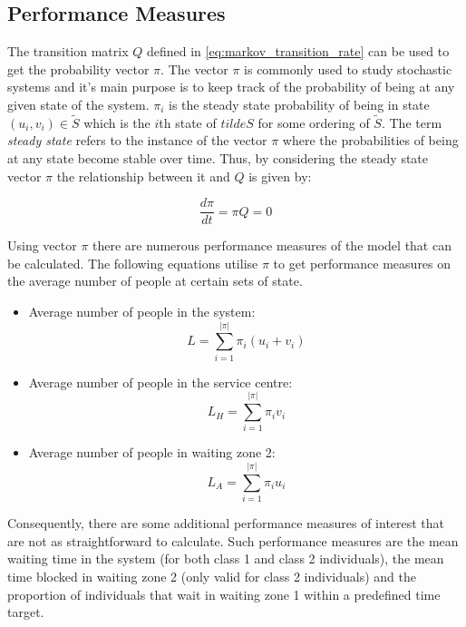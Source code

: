 \subsection{Performance Measures}


The transition matrix \( Q \) defined in \ref{eq:markov_transition_rate} can be 
used to get the probability vector \( \pi \).
The vector \( \pi \) is commonly used to study stochastic systems and it's main
purpose is to keep track of the probability of being at any given state of 
the system. \(\pi_i\) is the steady state probability of being in state \((u_i, v_i)\in\tilde S\) which is the \(i\)th state of \(tilde S\) for some ordering of \(\tilde S\).
The term \textit{steady state} refers to the instance of the vector \( \pi \) 
where the probabilities of being at any state become stable over time. 
Thus, by considering the steady state vector \( \pi \) the relationship between 
it and \( Q \) is given by:

\[
    \frac{d\pi}{dt} = \pi Q = 0
\]

Using vector \(\pi\) there are numerous performance measures of the model that 
can be calculated. 
The following equations utilise \(\pi\) to get performance measures on the 
average number of people at certain sets of state.

\begin{itemize}
    \item Average number of people in the system: 
        \[L = \sum_{i=1}^{|\pi|} \pi_i (u_i + v_i)\]
    \item Average number of people in the service centre: 
        \[L_H = \sum_{i=1}^{|\pi|} \pi_i v_i\]
    \item Average number of people in waiting zone 2:
        \[L_A = \sum_{i=1}^{|\pi|} \pi_i u_i\] 
\end{itemize}

Consequently, there are some additional performance measures of interest that
are not as straightforward to calculate.
Such performance measures are the mean waiting time in the system (for both 
class 1 and class 2 individuals), the mean time blocked in waiting zone 2 (only 
valid for class 2 individuals) and the proportion of individuals that wait in 
waiting zone 1 within a predefined time target.






